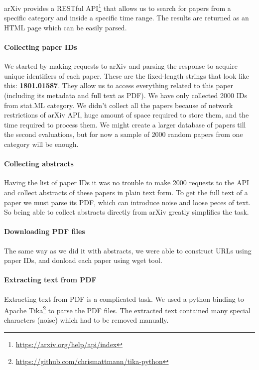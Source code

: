 \documentclass[sigplan]{acmart}
\begin{document}
arXiv provides a RESTful API\footnote{\url{https://arxiv.org/help/api/index}} that allows us to search for papers from a specific category and inside a specific time range. The results are returned as an HTML page which can be easily parsed.

\paragraph{Collecting paper IDs} We started by making requests to arXiv and parsing the response to acquire unique identifiers of each paper. These are the fixed-length strings that look like this: \textbf{1801.01587}. They allow us to access everything related to this paper (including its metadata and full text as PDF). We have only collected 2000 IDs from stat.ML category. We didn't collect all the papers because of network restrictions of arXiv API, huge amount of space required to store them, and the time required to process them. We might create a larger database of papers till the second evaluations, but for now a sample of 2000 random papers from one category will be enough.

\paragraph{Collecting abstracts} Having the list of paper IDs it was no trouble to make 2000 requests to the API and collect abstracts of these papers in plain text form. To get the full text of a paper we must parse its PDF, which can introduce noise and loose peces of text. So being able to collect abstracts directly from arXiv greatly simplifies the task.

\paragraph{Downloading PDF files} The same way as we did it with abstracts, we were able to construct URLs using paper IDs, and donload each paper using wget tool.

\paragraph{Extracting text from PDF} Extracting text from PDF is a complicated task. We used a python binding to Apache Tika\footnote{\url{https://github.com/chrismattmann/tika-python}} to parse the PDF files. The extracted text contained many special characters (noise) which had to be removed manually. 
\end{document}
